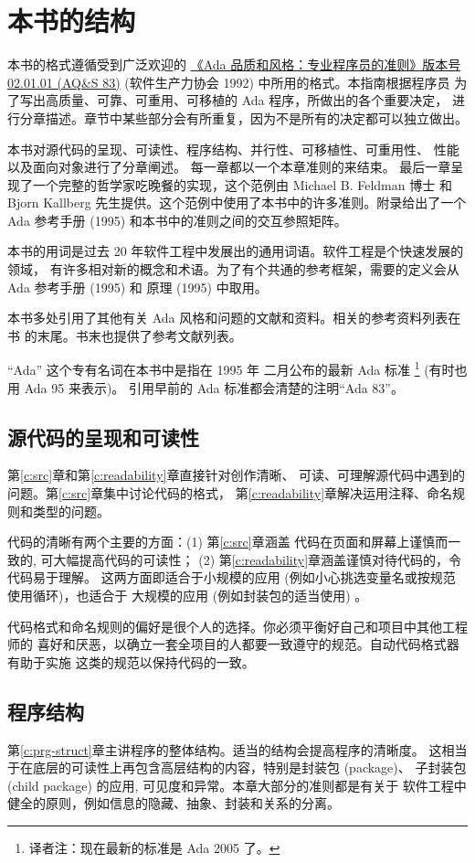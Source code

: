 \section{本书的结构}
本书的格式遵循受到广泛欢迎的
\href{http://archive.adaic.com/docs/style-guide/83style/html/}
{《Ada 品质和风格：专业程序员的准则》版本号
 02.01.01 (AQ\&S 83)} (软件生产力协会 1992) 中所用的格式。本指南根据程序员
为了写出高质量、可靠、可重用、可移植的 Ada 程序，所做出的各个重要决定，
进行分章描述。章节中某些部分会有所重复，因为不是所有的决定都可以独立做出。

本书对源代码的呈现、可读性、程序结构、并行性、可移植性、可重用性、
性能以及面向对象进行了分章阐述。 每一章都以一个本章准则的来结束。
最后一章呈现了一个完整的哲学家吃晚餐的实现，这个范例由 Michael B. Feldman 博士
和 Bjorn Kallberg 先生提供。这个范例中使用了本书中的许多准则。附录给出了一个
Ada 参考手册 (1995) 和本书中的准则之间的交互参照矩阵。

本书的用词是过去 20 年软件工程中发展出的通用词语。软件工程是个快速发展的领域，
有许多相对新的概念和术语。为了有个共通的参考框架，需要的定义会从 Ada 参考手册
(1995) 和 原理 (1995) 中取用。

本书多处引用了其他有关 Ada 风格和问题的文献和资料。相关的参考资料列表在书
的末尾。书末也提供了参考文献列表。

``Ada'' 这个专有名词在本书中是指在 1995 年 二月公布的最新 Ada 标准
\footnote{译者注：现在最新的标准是 Ada 2005 了。} (有时也用 Ada 95 来表示)。
引用早前的 Ada 标准都会清楚的注明``Ada 83''。

\subsection{源代码的呈现和可读性}
第\ref{c:src}章和第\ref{c:readability}章直接针对创作清晰、
可读、可理解源代码中遇到的问题。第\ref{c:src}章集中讨论代码的格式，
第\ref{c:readability}章解决运用注释、命名规则和类型的问题。

代码的清晰有两个主要的方面：(1) 第\ref{c:src}章涵盖
代码在页面和屏幕上谨慎而一致的, 可大幅提高代码的可读性；
(2) 第\ref{c:readability}章涵盖谨慎对待代码的，令代码易于理解。
这两方面即适合于小规模的应用 (例如小心挑选变量名或按规范使用循环)，也适合于
大规模的应用 (例如封装包的适当使用) 。

代码格式和命名规则的偏好是很个人的选择。你必须平衡好自己和项目中其他工程师的
喜好和厌恶，以确立一套全项目的人都要一致遵守的规范。自动代码格式器有助于实施
这类的规范以保持代码的一致。

\subsection{程序结构}
第\ref{c:prg-struct}章主讲程序的整体结构。适当的结构会提高程序的清晰度。
这相当于在底层的可读性上再包含高层结构的内容，特别是封装包 (package)、
子封装包 (child package) 的应用, 可见度和异常。本章大部分的准则都是有关于
软件工程中健全的原则，例如信息的隐藏、抽象、封装和关系的分离。

